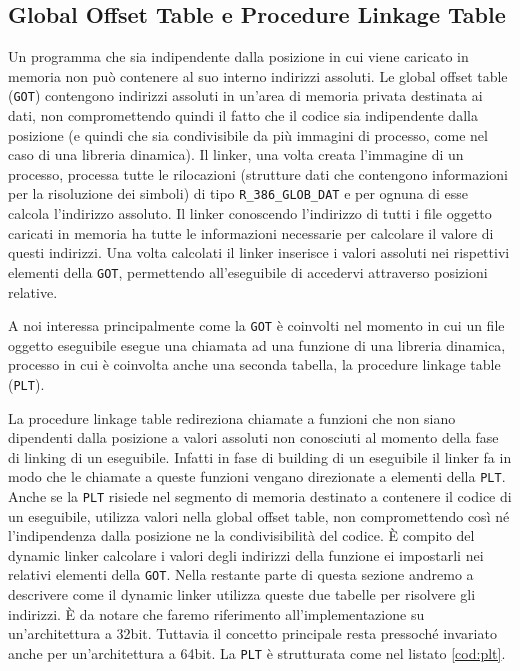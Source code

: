 \subsection{Global Offset Table e Procedure Linkage Table}

Un programma che sia indipendente dalla posizione in cui viene
caricato in memoria non può contenere al suo interno indirizzi
assoluti. Le global offset table (\lstinline{GOT}) contengono
indirizzi assoluti in un'area di memoria privata destinata ai dati,
non compromettendo quindi il fatto che il codice sia indipendente
dalla posizione (e quindi che sia condivisibile da più immagini di
processo, come nel caso di una libreria dinamica). Il linker, una
volta creata l'immagine di un processo, processa tutte le rilocazioni
(strutture dati che contengono informazioni per la risoluzione dei
simboli) di tipo \lstinline{R_386_GLOB_DAT} e per ognuna di esse
calcola l'indirizzo assoluto. Il linker conoscendo l'indirizzo di
tutti i file oggetto caricati in memoria ha tutte le informazioni
necessarie per calcolare il valore di questi indirizzi. Una volta
calcolati il linker inserisce i valori assoluti nei rispettivi
elementi della \lstinline{GOT}, permettendo all'eseguibile di
accedervi attraverso posizioni relative.

A noi interessa principalmente come la \lstinline{GOT} è coinvolti nel
momento in cui un file oggetto eseguibile esegue una chiamata ad una
funzione di una libreria dinamica, processo in cui è coinvolta anche
una seconda tabella, la procedure linkage table (\lstinline{PLT}).

La procedure linkage table redireziona chiamate a funzioni che non
siano dipendenti dalla posizione a valori assoluti non conosciuti al
momento della fase di linking di un eseguibile. Infatti in fase di
building di un eseguibile il linker fa in modo che le chiamate a
queste funzioni vengano direzionate a elementi della
\lstinline{PLT}. Anche se la \lstinline{PLT} risiede nel segmento di
memoria destinato a contenere il codice di un eseguibile, utilizza
valori nella global offset table, non compromettendo così né
l'indipendenza dalla posizione ne la condivisibilità del codice. È
compito del dynamic linker calcolare i valori degli indirizzi della
funzione ei impostarli nei relativi elementi della
\lstinline{GOT}. Nella restante parte di questa sezione andremo a
descrivere come il dynamic linker utilizza queste due tabelle per
risolvere gli indirizzi. È da notare che faremo riferimento
all'implementazione su un'architettura a 32bit. Tuttavia il concetto
principale resta pressoché invariato anche per un'architettura a
64bit. La \lstinline{PLT} è strutturata come nel listato
\ref{cod:plt}.

